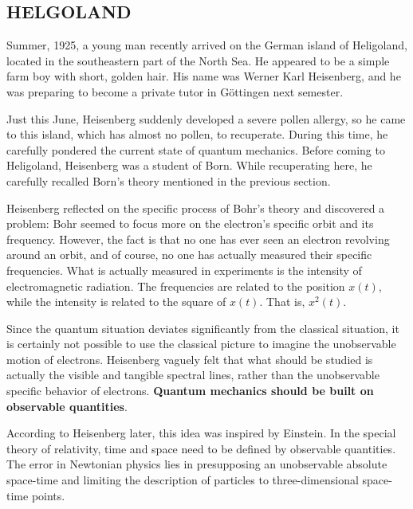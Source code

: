 \documentclass[a4paper, 12pt, oneside, onecolumn]{article}
\begin{document}
\begin{multicols}{2}
\section{HELGOLAND}
Summer, 1925, a young man recently arrived on the German island of Heligoland, located in the southeastern part of the North Sea. He appeared to be a simple farm boy with short, golden hair. His name was Werner Karl Heisenberg, and he was preparing to become a private tutor in Göttingen next semester.

Just this June, Heisenberg suddenly developed a severe pollen allergy, so he came to this island, which has almost no pollen, to recuperate. During this time, he carefully pondered the current state of quantum mechanics. Before coming to Heligoland, Heisenberg was a student of Born. While recuperating here, he carefully recalled Born's theory mentioned in the previous section.

Heisenberg reflected on the specific process of Bohr's theory and discovered a problem: Bohr seemed to focus more on the electron's specific orbit and its frequency. However, the fact is that no one has ever seen an electron revolving around an orbit, and of course, no one has actually measured their specific frequencies. What is actually measured in experiments is the intensity of electromagnetic radiation. The frequencies are related to the position $x \left( t \right)$, while the intensity is related to the square of $x\left( t \right)$. That is, $x^2 \left( t \right)$.

Since the quantum situation deviates significantly from the classical situation, it is certainly not possible to use the classical picture to imagine the unobservable motion of electrons. Heisenberg vaguely felt that what should be studied is actually the visible and tangible spectral lines, rather than the unobservable specific behavior of electrons. \textbf{Quantum mechanics should be built on observable quantities}.

According to Heisenberg later, this idea was inspired by Einstein\cite{heisenberg1971physics}. In the special theory of relativity, time and space need to be defined by observable quantities. The error in Newtonian physics lies in presupposing an unobservable absolute space-time and limiting the description of particles to three-dimensional space-time points.


\end{multicols}
\end{document}
